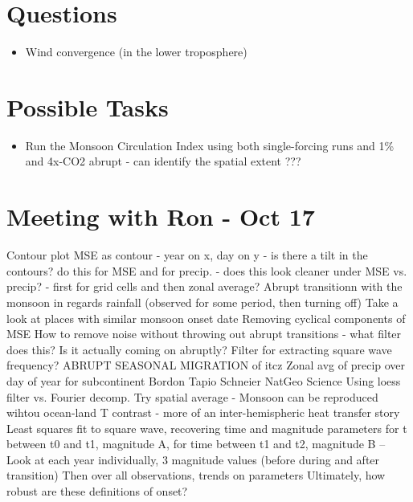 \documentclass[11pt,reqno]{amsart}
\begin{document}
\begin{itemize}
\section{Questions}

\begin{itemize}
	\item Wind convergence (in the lower troposphere)

\end{itemize}	 	




\section{Possible Tasks}
	\begin{itemize}
		\item Run the Monsoon Circulation Index using both single-forcing runs and 1\% and 4x-CO2 abrupt - can identify the spatial extent ??? 
	\end{itemize}




	
\section{Meeting with Ron - Oct 17}
	Contour plot 
	MSE as contour - year on x, day on y - is there a tilt in the contours?  
	do this for MSE and for precip. - does this look cleaner under MSE vs. precip?   - first for grid cells and then zonal average?  
	Abrupt transitionn with the monsoon in regards rainfall (observed for some period, then turning off)
	Take a look at places with similar monsoon onset date 
	Removing cyclical components of MSE 
	How to remove noise without throwing out abrupt transitions - what filter does this? 
	Is it actually coming on abruptly?  
	Filter for extracting square wave frequency?   
	ABRUPT SEASONAL MIGRATION of itcz 
	Zonal avg of precip over day of year for subcontinent 
	Bordon Tapio Schneier NatGeo Science 
	Using loess filter vs. Fourier decomp.  
	Try spatial average - 
	Monsoon can be reproduced wihtou ocean-land T contrast - more of an inter-hemispheric heat transfer story 
	Least squares fit to square wave, recovering time and magnitude parameters 
	for t between t0 and t1, magnitude A, for time between t1 and t2, magnitude B -- 
	Look at each year individually, 3 magnitude values (before during and after transition) 
	Then over all observations, trends on parameters
	Ultimately, how robust are these definitions of onset?  







\end{itemize}
\end{document}
